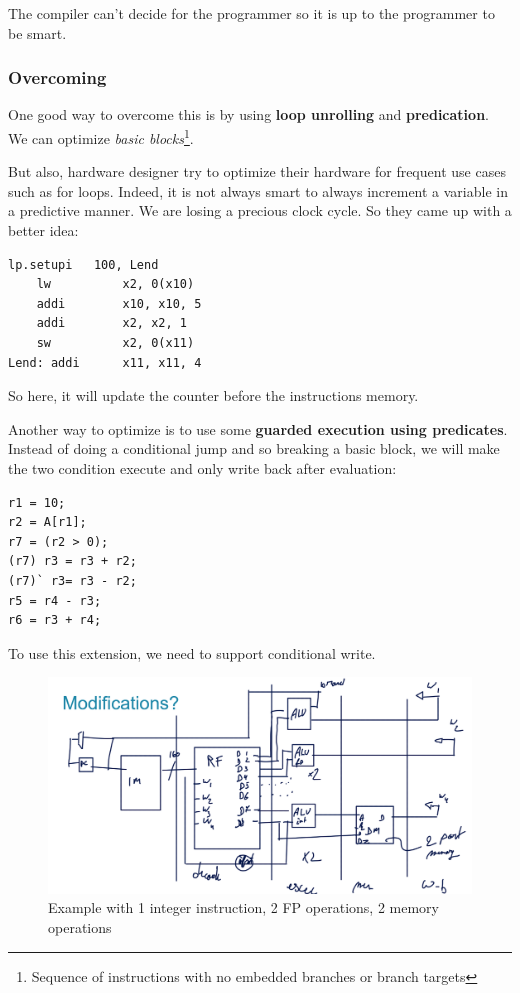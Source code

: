 \documentclass{report}
\begin{document}
The compiler can't decide for the programmer so it is up to the programmer to be smart.

\subsubsection{Overcoming}

One good way to overcome this is by using \textbf{loop unrolling} and \textbf{predication}. We can optimize \textit{basic blocks}\footnote{Sequence of instructions with no embedded branches or branch targets}.

But also, hardware designer try to optimize their hardware for frequent use cases such as for loops. Indeed, it is not always smart to always increment a variable in a predictive manner. We are losing a precious clock cycle. So they came up with a better idea:

\begin{lstlisting}[language={[RISC-V]Assembler}]
    lp.setupi   100, Lend
    lw          x2, 0(x10)
    addi        x10, x10, 5
    addi        x2, x2, 1
    sw          x2, 0(x11)
Lend: addi      x11, x11, 4
\end{lstlisting}

So here, it will update the counter before the instructions memory.

Another way to optimize is to use some \textbf{guarded execution using predicates}. Instead of doing a conditional jump and so breaking a basic block, we will make the two condition execute and only write back after evaluation:

\begin{lstlisting}[language={[RISC-V]Assembler}]
r1 = 10;
r2 = A[r1];
r7 = (r2 > 0);
(r7) r3 = r3 + r2;
(r7)` r3= r3 - r2;
r5 = r4 - r3;
r6 = r3 + r4;
\end{lstlisting}

To use this extension, we need to support conditional write.

\begin{figure}[H]
    \centering
    \includegraphics[width=0.75\linewidth]{multiple_issue_VLIW.png}
    \caption{Example with 1 integer instruction, 2 FP operations, 2 memory operations}
    \label{fig:VLIW-label}
\end{figure}
\end{document}
